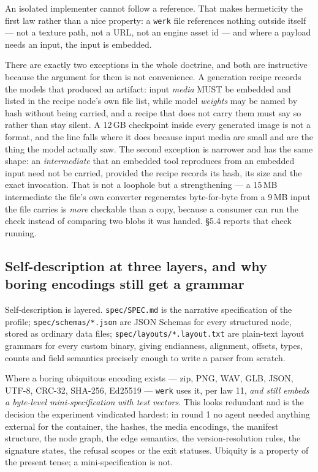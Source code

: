 \documentclass[10pt,twocolumn,letterpaper]{article}
\newcommand{\code}[1]{\texttt{\small #1}}
\begin{document}
An isolated implementer cannot follow a reference. That makes hermeticity the first law rather than a nice property: a \code{werk} file references nothing outside itself --- not a texture path, not a URL, not an engine asset id --- and where a payload needs an input, the input is embedded.

There are exactly two exceptions in the whole doctrine, and both are instructive because the argument for them is not convenience. A generation recipe records the models that produced an artifact: input \emph{media} MUST be embedded and listed in the recipe node's own file list, while model \emph{weights} may be named by hash without being carried, and a recipe that does not carry them must say so rather than stay silent. A 12\,GB checkpoint inside every generated image is not a format, and the line falls where it does because input media are small and are the thing the model actually saw. The second exception is narrower and has the same shape: an \emph{intermediate} that an embedded tool reproduces from an embedded input need not be carried, provided the recipe records its hash, its size and the exact invocation. That is not a loophole but a strengthening --- a 15\,MB intermediate the file's own converter regenerates byte-for-byte from a 9\,MB input the file carries is \emph{more} checkable than a copy, because a consumer can run the check instead of comparing two blobs it was handed. \S5.4 reports that check running.

\subsection{Self-description at three layers, and why boring encodings still get a grammar}

Self-description is layered. \code{spec/SPEC.md} is the narrative specification of the profile; \code{spec/schemas/*.json} are JSON Schemas for every structured node, stored as ordinary data files; \code{spec/layouts/*.layout.txt} are plain-text layout grammars for every custom binary, giving endianness, alignment, offsets, types, counts and field semantics precisely enough to write a parser from scratch.

Where a boring ubiquitous encoding exists --- zip, PNG, WAV, GLB, JSON, UTF-8, CRC-32, SHA-256, Ed25519 --- \code{werk} uses it, per law 11, \emph{and still embeds a byte-level mini-specification with test vectors}. This looks redundant and is the decision the experiment vindicated hardest: in round 1 no agent needed anything external for the container, the hashes, the media encodings, the manifest structure, the node graph, the edge semantics, the version-resolution rules, the signature states, the refusal scopes or the exit statuses. Ubiquity is a property of the present tense; a mini-specification is not.
\end{document}
